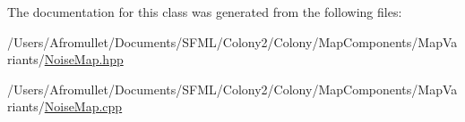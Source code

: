 The documentation for this class was generated from the following files\+:\begin{DoxyCompactItemize}
\item 
/\+Users/\+Afromullet/\+Documents/\+S\+F\+M\+L/\+Colony2/\+Colony/\+Map\+Components/\+Map\+Variants/\mbox{\hyperlink{_noise_map_8hpp}{Noise\+Map.\+hpp}}\item 
/\+Users/\+Afromullet/\+Documents/\+S\+F\+M\+L/\+Colony2/\+Colony/\+Map\+Components/\+Map\+Variants/\mbox{\hyperlink{_noise_map_8cpp}{Noise\+Map.\+cpp}}\end{DoxyCompactItemize}

